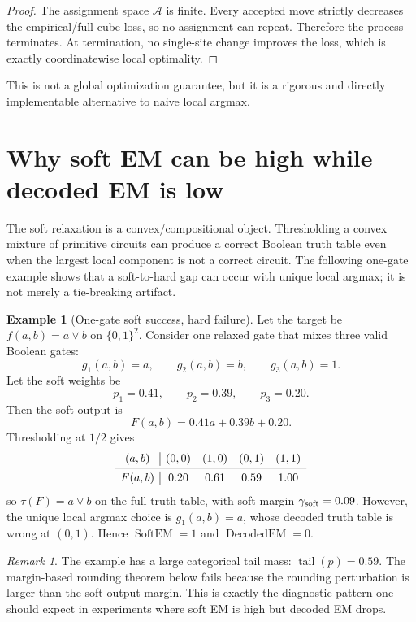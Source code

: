 \documentclass[11pt]{article}
\theoremstyle{definition}
\newtheorem{example}[theorem]{Example}
\theoremstyle{remark}
\newtheorem{remark}[theorem]{Remark}
\newcommand{\A}{\mathcal A}
\newcommand{\tail}{\operatorname{tail}}
\newcommand{\SoftEM}{\operatorname{SoftEM}}
\newcommand{\DecEM}{\operatorname{DecodedEM}}
\newcommand{\gammsoft}{\gamma_{\rm soft}}
\newcommand{\bits}{\{0,1\}}
\begin{document}
\begin{proof}
The assignment space $\A$ is finite.  Every accepted move strictly decreases the empirical/full-cube loss, so no assignment can repeat.  Therefore the process terminates.  At termination, no single-site change improves the loss, which is exactly coordinatewise local optimality.
\end{proof}

This is not a global optimization guarantee, but it is a rigorous and directly implementable alternative to naive local argmax.

\section{Why soft EM can be high while decoded EM is low}

The soft relaxation is a convex/compositional object.  Thresholding a convex mixture of primitive circuits can produce a correct Boolean truth table even when the largest local component is not a correct circuit.  The following one-gate example shows that a soft-to-hard gap can occur with unique local argmax; it is not merely a tie-breaking artifact.

\begin{example}[One-gate soft success, hard failure]
\label{ex:one-gate-gap}
Let the target be $f(a,b)=a\lor b$ on $\bits^2$.  Consider one relaxed gate that mixes three valid Boolean gates:
\[
    g_1(a,b)=a,
    \qquad
    g_2(a,b)=b,
    \qquad
    g_3(a,b)=1.
\]
Let the soft weights be
\[
    p_1=0.41,
    \qquad p_2=0.39,
    \qquad p_3=0.20.
\]
Then the soft output is
\[
    F(a,b)=0.41a+0.39b+0.20.
\]
Thresholding at $1/2$ gives
\[
\begin{array}{c|cccc}
(a,b) & (0,0)&(1,0)&(0,1)&(1,1)\\\midrule
F(a,b)&0.20&0.61&0.59&1.00
\end{array}
\]
so $\tau(F)=a\lor b$ on the full truth table, with soft margin $\gammsoft=0.09$.  However, the unique local argmax choice is $g_1(a,b)=a$, whose decoded truth table is wrong at $(0,1)$.  Hence $\SoftEM=1$ and $\DecEM=0$.
\end{example}

\begin{remark}
The example has a large categorical tail mass: $\tail(p)=0.59$.  The margin-based rounding theorem below fails because the rounding perturbation is larger than the soft output margin.  This is exactly the diagnostic pattern one should expect in experiments where soft EM is high but decoded EM drops.
\end{remark}
\end{document}
